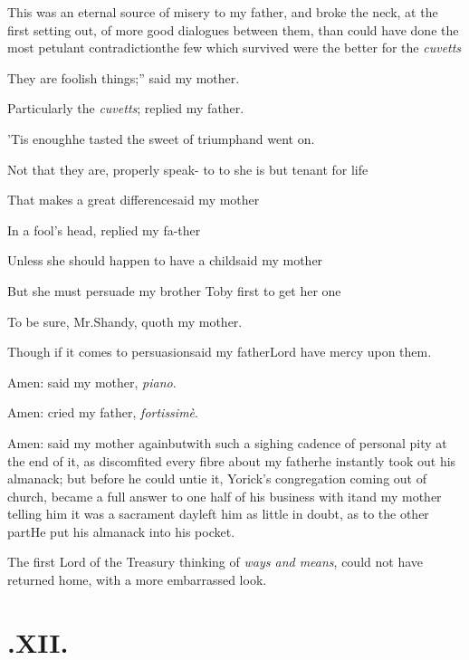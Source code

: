 \documentclass{article}
\begin{document}
This was an eternal source of misery to my father, and broke the
neck, at the first setting out, of more good dialogues between
them, than could have done the most petulant
contradiction\tsh the few which survived were the better
for the \textit{cuvetts}\tsh

\tsk \lqq They are foolish things;” said my
mother.

\tsh Particularly the \textit{cuvetts}; replied my
father.

’Tis enough\tsk he tasted the sweet of triumph\tsk and
went on.

\tsk Not that they are, properly speak-\break
\hbox to 
\hbox to 
she is but tenant for life\tsh{}

\tsh That makes a great difference\tsk\break said my
mother\tsh

\tsk In a fool’s head, replied my fa-\break ther\tsh

Unless she should happen to have a child\tsk said my
mother\tsh

\tsh But she must persuade my brother Toby first
to get her one\tsk

\tsh To be sure, Mr.\@ Shandy, quoth my mother.

\tsh Though if it comes to persuasion\break\tsk said my
father\tsk Lord have mercy upon them.

Amen: said my mother, \textit{piano}.

Amen: cried my father, \textit{fortissimè}.

Amen: said my mother again\tsk but\break with such a sighing
cadence of personal pity at the end of it, as discomfited every
fibre about my father\tsk he instantly took out his almanack; but
before he could untie it, Yorick’s congregation coming
out of church, became a full answer to one half of his business
with it\tsk and my mother telling him it was a sacrament day\tsk left
him as little in doubt, as to the other part\tsk He put his
almanack into his pocket.

The first Lord of the Treasury thinking of \textit{ways and
means}, could not have returned home, with a more embarrassed
look.

\vfill{}\eject
\section{.\enspace XII.}
\end{document}
